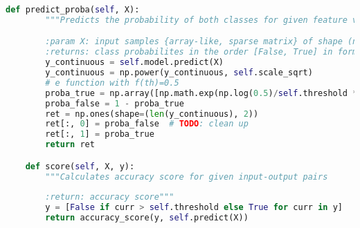 \begin{lstlisting}[language=Python, basicstyle=\scriptsize, tabsize=4]
    def predict_proba(self, X):
        """Predicts the probability of both classes for given feature vectors

        :param X: input samples {array-like, sparse matrix} of shape (n_samples, n_features}
        :returns: class probabilites in the order [False, True] in form (n_samples,2)"""
        y_continuous = self.model.predict(X)
        y_continuous = np.power(y_continuous, self.scale_sqrt)
        # e function with f(th)=0.5
        proba_true = np.array([np.math.exp(np.log(0.5)/self.threshold * y) for y in y_continuous])
        proba_false = 1 - proba_true
        ret = np.ones(shape=(len(y_continuous), 2))
        ret[:, 0] = proba_false  # TODO: clean up
        ret[:, 1] = proba_true
        return ret

    def score(self, X, y):
        """Calculates accuracy score for given input-output pairs
        
        :return: accuracy score"""
        y = [False if curr > self.threshold else True for curr in y]
        return accuracy_score(y, self.predict(X))
\end{lstlisting}

